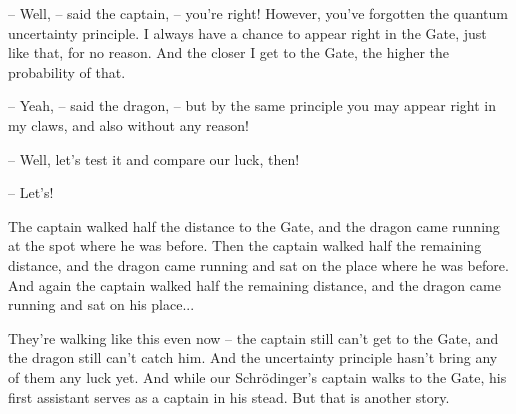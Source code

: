 \documentclass[ebook,twoside,final,openright]{memoir}
\begin{document}
– Well, – said the captain, – you’re right! However, you’ve forgotten the quantum uncertainty principle. I always have a chance to appear right in the Gate, just like that, for no reason. And the closer I get to the Gate, the higher the probability of that.\par
– Yeah, – said the dragon, – but by the same principle you may appear right in my claws, and also without any reason!\par
– Well, let’s test it and compare our luck, then!\par
– Let’s!\par
\par
The captain walked half the distance to the Gate, and the dragon came running at the spot where he was before. Then the captain walked half the remaining distance, and the dragon came running and sat on the place where he was before. And again the captain walked half the remaining distance, and the dragon came running and sat on his place...\par
\par
They're walking like this even now – the captain still can’t get to the Gate, and the dragon still can’t catch him. And the uncertainty principle hasn’t bring any of them any luck yet. And while our Schrödinger’s captain walks to the Gate, his first assistant serves as a captain in his stead. But that is another story.
\end{document}

